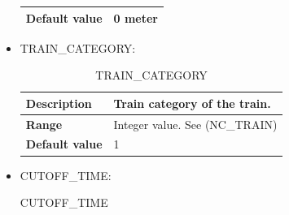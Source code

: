 \documentclass{template/openetcs}
\begin{document}
\begin{itemize}
\begin{longtable}{|l|l|}
				\hline
				
					\begin{minipage}[t]{0.22\linewidth} \textbf{Default value}	\end{minipage} 
				&	\begin{minipage}[t]{0.78\linewidth} 0 meter \end{minipage} \\
				
				\hline
				
			\end{longtable}
			
		\item TRAIN\_CATEGORY:
																			
			\begin{longtable}{|l|l|}
				\caption{TRAIN\_CATEGORY}\\ 
				\hline
				
					\begin{minipage}[t]{0.22\linewidth} \textbf{Description}	\end{minipage} 
				&	\begin{minipage}[t]{0.78\linewidth} Train category of the train. \end{minipage} \\
				
				\hline
																																									
					\begin{minipage}[t]{0.22\linewidth} \textbf{Range}	\end{minipage} 
				&	\begin{minipage}[t]{0.78\linewidth} Integer value. See (NC\_TRAIN) \end{minipage} \\
				
				\hline
				
					\begin{minipage}[t]{0.22\linewidth} \textbf{Default value}	\end{minipage} 
				&	\begin{minipage}[t]{0.78\linewidth} 1 \end{minipage} \\
				
				\hline
				
			\end{longtable}
			
		\item CUTOFF\_TIME:
																					
			\begin{longtable}{|l|l|}
				\caption{CUTOFF\_TIME}\\ 
				\hline
				

\end{longtable}
\end{itemize}
\end{document}
